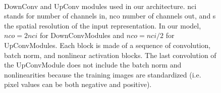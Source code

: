 \begin{appendices}
\begin{figure}
    \begin{center}
    \\
    \end{center}
    \caption{
    \protect{} DownConv and \protect{} UpConv modules used in our architecture. nci stands for number of channels in, nco number of channels out, and s the spatial resolution of the input representation. In our model, $nco = 2 nci$ for DownConvModules and $nco = nci/2$ for UpConvModules. Each block is made of a sequence of convolution, batch norm, and nonlinear activation blocks. The last convolution of the UpConvModule does not include the batch norm and nonlinearities because the training images are standardized (i.e. pixel values can be both negative and positive).
    }
    \label{fig:cib-ae_modules}
\end{figure}


\end{appendices}
